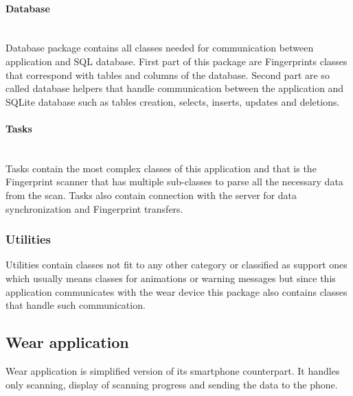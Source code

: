 \paragraph{Database}\label{subsec:Database}\mbox{} \\
Database package contains all classes needed for communication between application and SQL database. First part of this package are Fingerprints classes that correspond with tables and columns of the database. Second part are so called database helpers that handle communication between the application and SQLite database such as tables creation, selects, inserts, updates and deletions.

\paragraph{Tasks}\label{subsec:Tasks}\mbox{} \\
Tasks contain the most complex classes of this application and that is the Fingerprint scanner that has multiple sub-classes to parse all the necessary data from the scan. Tasks also contain connection with the server for data synchronization and Fingerprint transfers.

\subsubsection{Utilities}\label{subsec:Utilities}
Utilities contain classes not fit to any other category or classified as support ones which usually means classes for animations or warning messages but since this application communicates with the wear device this package also contains classes that handle such communication.

\subsection{Wear application}\label{subsec:WearApplication}
Wear application is simplified version of its smartphone counterpart. It handles only scanning, display of scanning progress and sending the data to the phone. 